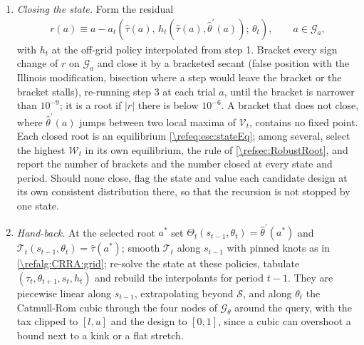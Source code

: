 \begin{alg}
\begin{enumerate}
    \item \emph{Closing the state.} Form the residual
    \begin{align}\label{\refeq:esc:aResidual}
        r(a) \equiv a - a_t\left(\hat{\tau}(a),\,h_t\left(\hat{\tau}(a),\hat{\theta}^{\prime}(a)\right);\,\theta_t\right), \qquad a\in\mathcal{G}_{a},
    \end{align}
    with $h_t$ at the off-grid policy interpolated from step 1. Bracket every sign change of $r$ on $\mathcal{G}_{a}$ and close it by a bracketed secant (false position with the Illinois modification, bisection where a step would leave the bracket or the bracket stalls), re-running step 3 at each trial $a$, until the bracket is narrower than $10^{-9}$; it is a root if $\left|r\right|$ there is below $10^{-6}$. A bracket that does not close, where $\hat{\theta}^{\prime}(a)$ jumps between two local maxima of $\mathcal{V}_t$, contains no fixed point. Each closed root is an equilibrium \eqref{\refeq:esc:stateEq}; among several, select the highest $\mathcal{W}_t$ in its own equilibrium, the rule of \cref{\refsec:RobustRoot}, and report the number of brackets and the number closed at every state and period. Should none close, flag the state and value each candidate design at its own consistent distribution there, so that the recursion is not stopped by one state.
    \item \emph{Hand-back.} At the selected root $a^{\ast}$ set $\Theta_t\left(s_{t-1},\theta_t\right) = \hat{\theta}^{\prime}\left(a^{\ast}\right)$ and $\mathcal{T}_t\left(s_{t-1},\theta_t\right) = \hat{\tau}\left(a^{\ast}\right)$; smooth $\mathcal{T}_t$ along $s_{t-1}$ with pinned knots as in \cref{\refalg:CRRA:grid}; re-solve the state at these policies, tabulate $\left(\tau_t,\theta_{t+1},s_t,h_t\right)$ and rebuild the interpolants for period $t-1$. They are piecewise linear along $s_{t-1}$, extrapolating beyond $\mathcal{S}$, and along $\theta_t$ the Catmull-Rom cubic through the four nodes of $\mathcal{G}_{\theta}$ around the query, with the tax clipped to $[l,u]$ and the design to $[0,1]$, since a cubic can overshoot a bound next to a kink or a flat stretch.
\end{enumerate}
\end{alg}

